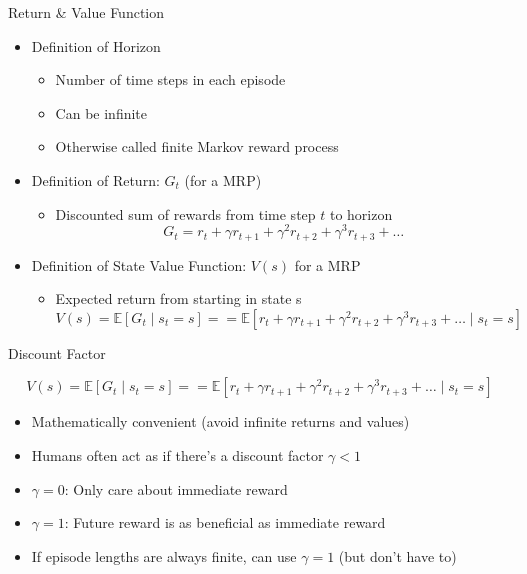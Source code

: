 \begin{frame}[c]{Return \& Value Function}
	
	\begin{itemize}
		\item Definition of Horizon
		\begin{itemize}
			\item Number of time steps in each episode
			\item Can be infinite
			\item Otherwise called finite Markov reward process
		\end{itemize}
	\smallskip
	\pause
		\item Definition of Return: $G_t$ (for a MRP)
		\begin{itemize}
			\item Discounted sum of rewards from time step $t$ to horizon
			$$ G_t = r_t + \gamma r_{t+1} + \gamma^2 r_{t+2} + \gamma^3 r_{t+3} + \ldots$$
		\end{itemize}
	\smallskip
	\pause
	\item Definition of State Value Function: $V(s)$ for a MRP
	\begin{itemize}
		\item Expected return from starting in state s
		$$ V(s)  = \mathbb{E}[G_t \mid s_t=s] == \mathbb{E}[r_t + \gamma r_{t+1} + \gamma^2 r_{t+2} + \gamma^3 r_{t+3} + \ldots \mid s_t = s]$$
	\end{itemize}
	\end{itemize}
	
\end{frame}
\begin{frame}[c]{Discount Factor}
	
$$ V(s)  = \mathbb{E}[G_t \mid s_t=s] == \mathbb{E}[r_t + \gamma r_{t+1} + \gamma^2 r_{t+2} + \gamma^3 r_{t+3} + \ldots \mid s_t = s]$$
	
	\begin{itemize}
		\item Mathematically convenient (avoid infinite returns and values)
		\item Humans often act as if there’s a discount factor $\gamma < 1$
		\item $\gamma = 0$: Only care about immediate reward
		\item $\gamma = 1$: Future reward is as beneficial as immediate reward
		\item If episode lengths are always finite, can use $\gamma = 1$ (but don't have to)
	\end{itemize}
	
\end{frame}
